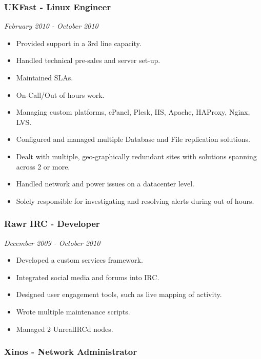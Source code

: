 \subsubsection{UKFast - Linux Engineer}\label{ukfast---linux-engineer}

\emph{February 2010 - October 2010}

\begin{itemize}
\itemsep1pt\parskip0pt
\item
  Provided support in a 3rd line capacity.
\item
  Handled technical pre-sales and server set-up.
\item
  Maintained SLAs.
\item
  On-Call/Out of hours work.
\item
  Managing custom platforms, cPanel, Plesk, IIS, Apache, HAProxy, Nginx,
  LVS.
\item
  Configured and managed multiple Database and File replication
  solutions.
\item
  Dealt with multiple, geo-graphically redundant sites with solutions
  spanning across 2 or more.
\item
  Handled network and power issues on a datacenter level.
\item
  Solely responsible for investigating and resolving alerts during out
  of hours.
\end{itemize}

\subsubsection{Rawr IRC - Developer}\label{rawr-irc---developer}

\emph{December 2009 - October 2010}

\begin{itemize}
\itemsep1pt\parskip0pt
\item
  Developed a custom services framework.
\item
  Integrated social media and forums into IRC.
\item
  Designed user engagement tools, such as live mapping of activity.
\item
  Wrote multiple maintenance scripts.
\item
  Managed 2 UnrealIRCd nodes.
\end{itemize}

\subsubsection{Xinos - Network
Administrator}\label{xinos---network-administrator}

